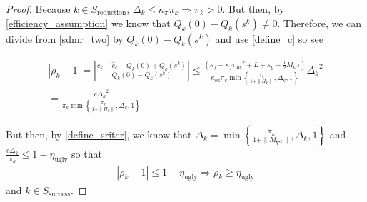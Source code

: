 \documentclass{article}
\newtheorem{lemma}[theorem]{Lemma}
\theoremstyle{case}
\newcommand{\naturals}{{\mathbb N}}
\newcommand{\xk}{{x^k}}
\newcommand{\qk}{{Q_k}}
\newcommand{\ck}{{c_k}}
\newcommand{\gk}{{g^k}}
\newcommand{\hk}{{H_k}}
\newcommand{\domain}{{\Omega}}
\newcommand{\dk}{{\Delta_k}}
\newcommand{\rk}{{\rho_k}}
\newcommand{\pik}{{\pi_k}}
\newcommand{\sk}{{s^k}}
\newcommand{\ctrialk}{{\hat c_k}}
\newcommand{\kappaf}{{\kappa_{f}}}
\newcommand{\kappag}{{\kappa_{g}}}
\newcommand{\maxhes}{{M_{\nabla^2}}}
\newcommand{\kcrit}{{\kappa_{\pi}}}
\newcommand{\tinc}{{\tau_{\text{inc}}}}
\newcommand{\eugly}{{\eta_{\text{ugly}}}}
\newcommand{\success}{{S_{\text{success}}}}
\newcommand{\sriter}{{S_{\text{reduction}}}}
\newcommand{\keff}{{\kappa_{\text{eff}}}}
\newcommand{\dmax}{{\Delta_{\text{max}}}}
\begin{document}
\begin{proof}
Because $k \in \sriter$, $\dk \le \kcrit \pik\Longrightarrow \pik > 0$.
But then, by \cref{efficiency_assumption} we know that $\qk(0) - \qk(\sk) \ne 0$.
Therefore, we can divide from \cref{sdmr_two} by $\qk(0) - \qk(\sk)$ and use \cref{define_c} so see

\begin{align*}
\left|\rk - 1 \right| = \left| \frac{\ck - \ctrialk - \qk(0) + \qk(\sk)}{\qk(0) - \qk(\sk)} \right| 
\le \frac{\left(\kappaf + \kappaf\tinc^2 + L + \kappag + \frac 1 2 \maxhes\right)}{\keff \pik \min\left\{ \frac{\pik}{1 + \|\hk\|}, \dk, 1\right\}} \dk^2 \\
= \frac{c \dk^2}{\pik \min\left\{ \frac{\pik}{1 + \|\hk\|}, \dk, 1\right\}}
\end{align*}

But then, by \cref{define_sriter}, we know that 
$\dk = \min\left\{ \frac{\pik}{1 + \|\maxhes\|}, \dk, 1\right\}$ and
$\frac{c\dk}{\pik} \le 1 - \eugly$
so that
\begin{align*}
\left|\rk - 1 \right| \le 1 - \eugly \Longrightarrow \rk \ge \eugly
\end{align*}
and $k \in \success$.
\end{proof}




% 
% 
% 
% 
% 
% 
% 
% 
% 
\end{document}
